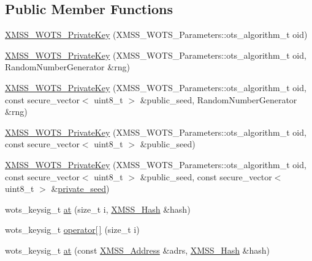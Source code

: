 \subsection*{Public Member Functions}
\begin{DoxyCompactItemize}
\item 
\hyperlink{class_botan_1_1_x_m_s_s___w_o_t_s___private_key_a2f1058b65a5dfc523afd1f7bc93297a2}{X\+M\+S\+S\+\_\+\+W\+O\+T\+S\+\_\+\+Private\+Key} (X\+M\+S\+S\+\_\+\+W\+O\+T\+S\+\_\+\+Parameters\+::ots\+\_\+algorithm\+\_\+t oid)
\item 
\hyperlink{class_botan_1_1_x_m_s_s___w_o_t_s___private_key_ab327590ef27314723fd71cfc1cdfaef2}{X\+M\+S\+S\+\_\+\+W\+O\+T\+S\+\_\+\+Private\+Key} (X\+M\+S\+S\+\_\+\+W\+O\+T\+S\+\_\+\+Parameters\+::ots\+\_\+algorithm\+\_\+t oid, Random\+Number\+Generator \&rng)
\item 
\hyperlink{class_botan_1_1_x_m_s_s___w_o_t_s___private_key_af1f9f24679ab1138032165f56cf3e9cd}{X\+M\+S\+S\+\_\+\+W\+O\+T\+S\+\_\+\+Private\+Key} (X\+M\+S\+S\+\_\+\+W\+O\+T\+S\+\_\+\+Parameters\+::ots\+\_\+algorithm\+\_\+t oid, const secure\+\_\+vector$<$ uint8\+\_\+t $>$ \&public\+\_\+seed, Random\+Number\+Generator \&rng)
\item 
\hyperlink{class_botan_1_1_x_m_s_s___w_o_t_s___private_key_ac090ca809dbcf80cdbd4ef6529d58e09}{X\+M\+S\+S\+\_\+\+W\+O\+T\+S\+\_\+\+Private\+Key} (X\+M\+S\+S\+\_\+\+W\+O\+T\+S\+\_\+\+Parameters\+::ots\+\_\+algorithm\+\_\+t oid, const secure\+\_\+vector$<$ uint8\+\_\+t $>$ \&public\+\_\+seed)
\item 
\hyperlink{class_botan_1_1_x_m_s_s___w_o_t_s___private_key_aadd32d2c3fb5045d5a1cec31d85cdbce}{X\+M\+S\+S\+\_\+\+W\+O\+T\+S\+\_\+\+Private\+Key} (X\+M\+S\+S\+\_\+\+W\+O\+T\+S\+\_\+\+Parameters\+::ots\+\_\+algorithm\+\_\+t oid, const secure\+\_\+vector$<$ uint8\+\_\+t $>$ \&public\+\_\+seed, const secure\+\_\+vector$<$ uint8\+\_\+t $>$ \&\hyperlink{class_botan_1_1_x_m_s_s___w_o_t_s___private_key_a401b9dde3140edf386dba700b880b265}{private\+\_\+seed})
\item 
wots\+\_\+keysig\+\_\+t \hyperlink{class_botan_1_1_x_m_s_s___w_o_t_s___private_key_ac79a078ba4db7829e1065721c8980cfa}{at} (size\+\_\+t i, \hyperlink{class_botan_1_1_x_m_s_s___hash}{X\+M\+S\+S\+\_\+\+Hash} \&hash)
\item 
wots\+\_\+keysig\+\_\+t \hyperlink{class_botan_1_1_x_m_s_s___w_o_t_s___private_key_ae80b5d24e94411aa807ba31e6662658e}{operator\mbox{[}$\,$\mbox{]}} (size\+\_\+t i)
\item 
wots\+\_\+keysig\+\_\+t \hyperlink{class_botan_1_1_x_m_s_s___w_o_t_s___private_key_a5d454383924b5d2613cbce18417a9808}{at} (const \hyperlink{class_botan_1_1_x_m_s_s___address}{X\+M\+S\+S\+\_\+\+Address} \&adrs, \hyperlink{class_botan_1_1_x_m_s_s___hash}{X\+M\+S\+S\+\_\+\+Hash} \&hash)

\end{DoxyCompactItemize}
